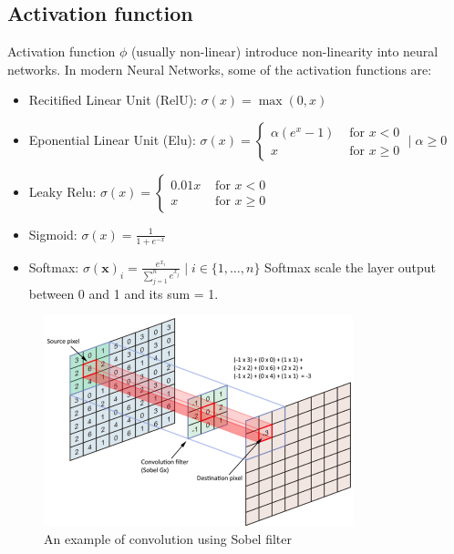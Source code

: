 \subsection{Activation function}
Activation function $\phi$ (usually non-linear) introduce non-linearity into neural networks.
In modern Neural Networks, some of the activation functions are:
\begin{itemize}
	\item Recitified Linear Unit (RelU): $\sigma(x)=\max (0, x)$
	\item Eponential Linear Unit (Elu): $\sigma(x)=\left\{\begin{array}{ll}\alpha\left(e^{x}-1\right) & \text { for } x<0 \\ x & \text { for } x \geq 0\end{array} \mid \alpha \geq 0\right.$
	\item Leaky Relu: $\sigma(x)=\left\{\begin{array}{ll}0.01 x & \text { for } x<0 \\ x & \text { for } x \geq 0\end{array}\right.$
	\item Sigmoid: $\sigma(x)=\frac{1}{1+e^{-x}}$
	\item Softmax: $\sigma(\boldsymbol{x})_{i}=\frac{e^{x_{i}}}{\sum_{j=1}^{n} e^{x_{j}}} \mid i \in\{1, \ldots, n\}$ Softmax scale the layer output between 0 and 1 and its sum = 1.
\end{itemize}

\begin{figure}[h]
	\centering
	\includegraphics[width=0.8\textwidth]{img/background_img/convolution}
	\caption{An example of convolution using Sobel filter} 
	\label{fig:convolution}
\end{figure}


